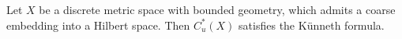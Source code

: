 

\begin{satz}
		Let $X$ be a discrete metric space with bounded geometry, which admits a coarse embedding into a Hilbert space. Then $C_u^*(X)$ satisfies the Künneth formula.
	\end{satz}
